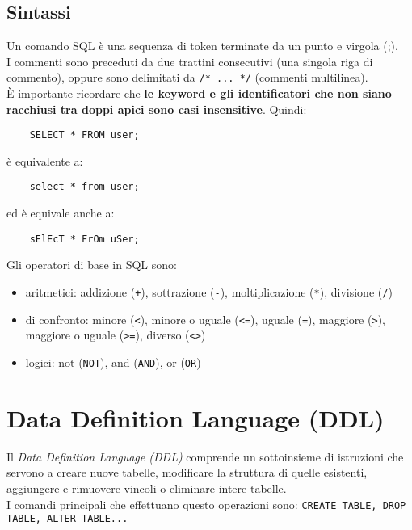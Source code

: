 \documentclass[12pt,a4paper]{book}
\begin{document}
	\section{Sintassi}
	Un comando SQL è una sequenza di token terminate da un punto e virgola (;).\\
	I commenti sono preceduti da due trattini consecutivi (una singola riga di commento), oppure sono delimitati da \texttt{/* ... */} (commenti multilinea).\\
	È importante ricordare che \textbf{le keyword e gli identificatori che non siano racchiusi tra doppi apici sono casi insensitive}. Quindi:
	\begin{lstlisting}
	SELECT * FROM user;
	\end{lstlisting}
	è equivalente a:
	\begin{lstlisting}
	select * from user;
	\end{lstlisting}
	ed è equivale anche a:
	\begin{lstlisting}
	sElEcT * FrOm uSer;
	\end{lstlisting}
	Gli operatori di base in SQL sono: 
	\begin{itemize}
		\item aritmetici: addizione (\texttt{+}), sottrazione (\texttt{-}), moltiplicazione (\texttt{*}), divisione (\texttt{/})
		\item di confronto: minore (\texttt{<}), minore o uguale (\texttt{<=}), uguale (\texttt{=}), maggiore (\texttt{>}), maggiore o uguale (\texttt{>=}), diverso (\texttt{<>})
		\item logici: not (\texttt{NOT}), and (\texttt{AND}), or (\texttt{OR})
	\end{itemize}
	\chapter{Data Definition Language (DDL)}
	Il \textit{Data Definition Language (DDL)} comprende un sottoinsieme di istruzioni che servono a creare nuove tabelle, modificare la struttura di quelle esistenti, aggiungere e rimuovere vincoli o eliminare intere tabelle.\\I comandi principali che effettuano questo operazioni sono: \texttt{CREATE TABLE, DROP TABLE, ALTER TABLE...}
\end{document}
